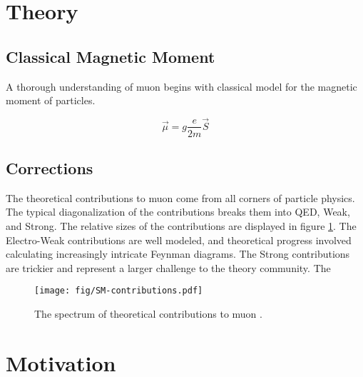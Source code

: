\section{Theory}

\subsection{Classical Magnetic Moment}

A thorough understanding of muon \gmtwo begins with classical model for the magnetic moment of particles. 

\begin{equation}
\vec{\mu} = g \frac{e}{2m}\vec{S}
\label{eqn:spin-magnetic-moment}
\end{equation}


\subsection{Corrections}

The theoretical contributions to muon \gmtwo come from all corners of particle physics.  The typical diagonalization of the contributions breaks them into QED, Weak, and Strong. The relative sizes of the contributions are displayed in figure \ref{fig:sm-contributions}. The Electro-Weak contributions are well modeled, and theoretical progress involved calculating increasingly intricate Feynman diagrams.  The Strong contributions are trickier and represent a larger challenge to the theory community.  The 

\begin{figure}
\texttt{[image: fig/SM-contributions.pdf]}
\label{fig:sm-contributions}
\caption{The spectrum of theoretical contributions to muon \gmtwo.}
\end{figure}

\section{Motivation}



